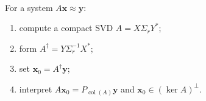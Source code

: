 \begin{method} \label{meth:pseudoinverse-solution-method} \\
For a system $A\mathbf{x}\approx\mathbf{y}$:
\begin{enumerate}[label=(\roman*)]
\setlength{\itemsep}{0pt}
\item compute a compact SVD $A=X\Sigma_rY^*$;
\item form $A^{\dagger}=Y\Sigma_r^{-1}X^*$;
\item set $\mathbf{x}_0=A^{\dagger}\mathbf{y}$;
\item interpret $A\mathbf{x}_0=P_{\operatorname{col}(A)}\mathbf{y}$ and $\mathbf{x}_0\in(\ker A)^{\perp}$.
\end{enumerate}
\end{method}
